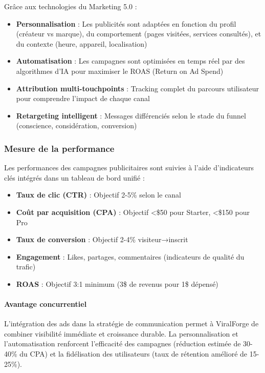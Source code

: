 Grâce aux technologies du Marketing 5.0 :
\begin{itemize}
    \item \textbf{Personnalisation} : Les publicités sont adaptées en fonction du profil (créateur vs marque), du comportement (pages visitées, services consultés), et du contexte (heure, appareil, localisation)
    \item \textbf{Automatisation} : Les campagnes sont optimisées en temps réel par des algorithmes d'IA pour maximiser le ROAS (Return on Ad Spend)
    \item \textbf{Attribution multi-touchpoints} : Tracking complet du parcours utilisateur pour comprendre l'impact de chaque canal
    \item \textbf{Retargeting intelligent} : Messages différenciés selon le stade du funnel (conscience, considération, conversion)
\end{itemize}

\subsubsection{Mesure de la performance}

Les performances des campagnes publicitaires sont suivies à l'aide d'indicateurs clés intégrés dans un tableau de bord unifié :

\begin{itemize}
    \item \textbf{Taux de clic (CTR)} : Objectif 2-5\% selon le canal
    \item \textbf{Coût par acquisition (CPA)} : Objectif <\$50 pour Starter, <\$150 pour Pro
    \item \textbf{Taux de conversion} : Objectif 2-4\% visiteur→inscrit
    \item \textbf{Engagement} : Likes, partages, commentaires (indicateurs de qualité du trafic)
    \item \textbf{ROAS} : Objectif 3:1 minimum (3\$ de revenus pour 1\$ dépensé)
\end{itemize}

\paragraph{Avantage concurrentiel}

L'intégration des ads dans la stratégie de communication permet à ViralForge de combiner visibilité immédiate et croissance durable. La personnalisation et l'automatisation renforcent l'efficacité des campagnes (réduction estimée de 30-40\% du CPA) et la fidélisation des utilisateurs (taux de rétention amélioré de 15-25\%).

